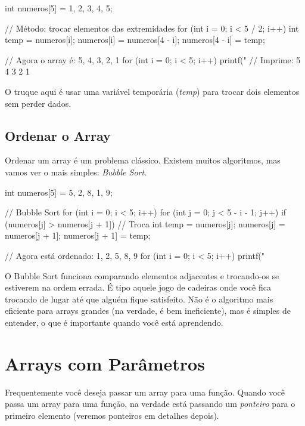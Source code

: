 \begin{ccode}
  int numeros[5] = {1, 2, 3, 4, 5};

  // Método: trocar elementos das extremidades
  for (int i = 0; i < 5 / 2; i++) {
    int temp = numeros[i];
    numeros[i] = numeros[4 - i];
    numeros[4 - i] = temp;
  }

  // Agora o array é: {5, 4, 3, 2, 1}
  for (int i = 0; i < 5; i++) {
    printf("%
  }
  // Imprime: 5 4 3 2 1
\end{ccode}

O truque aqui é usar uma variável temporária (\textit{temp}) para trocar dois elementos sem perder dados.

\subsection{Ordenar o Array}

Ordenar um array é um problema clássico. Existem muitos algoritmos, mas vamos ver o mais simples: \textit{Bubble Sort}.

\begin{ccode}
  int numeros[5] = {5, 2, 8, 1, 9};

  // Bubble Sort
  for (int i = 0; i < 5; i++) {
    for (int j = 0; j < 5 - i - 1; j++) {
      if (numeros[j] > numeros[j + 1]) {
        // Troca
        int temp = numeros[j];
        numeros[j] = numeros[j + 1];
        numeros[j + 1] = temp;
      }
    }
  }

  // Agora está ordenado: {1, 2, 5, 8, 9}
  for (int i = 0; i < 5; i++) {
    printf("%
  }
\end{ccode}

O Bubble Sort funciona comparando elementos adjacentes e trocando-os se estiverem na ordem errada. É tipo aquele jogo de cadeiras onde você fica trocando de lugar até que alguém fique satisfeito. Não é o algoritmo mais eficiente para arrays grandes (na verdade, é bem ineficiente), mas é simples de entender, o que é importante quando você está aprendendo.

\section{Arrays com Parâmetros}

Frequentemente você deseja passar um array para uma função. Quando você passa um array para uma função, na verdade está passando um \textit{ponteiro} para o primeiro elemento (veremos ponteiros em detalhes depois).

